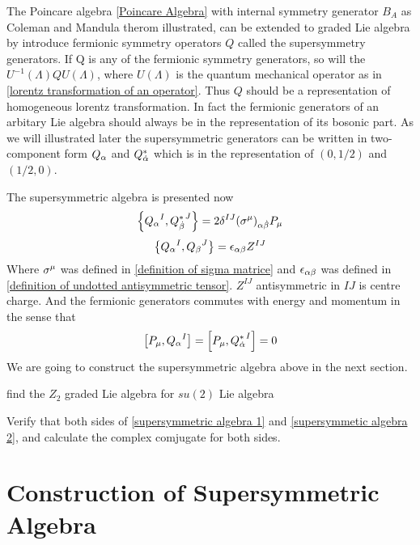     The Poincare algebra \eqref{Poincare Algebra} with internal symmetry generator $B_A$ as Coleman and Mandula therom illustrated, can be extended to graded Lie algebra by introduce fermionic symmetry operators $Q$ called the supersymmetry generators. If Q is any of the fermionic symmetry generators, so will the $U^{-1}(\Lambda) Q U(\Lambda)$, where $U(\Lambda)$ is the quantum mechanical operator as in \eqref{lorentz transformation of an operator}. Thus $Q$ should be a representation of homogeneous lorentz transformation.
    In fact the fermionic generators of an arbitary Lie algebra should always be in the representation of its bosonic part. As we will illustrated later the supersymmetric generators can be written in two-component form $Q_\alpha$ and $Q^{*}_{\dot{\alpha}}$ which is in the representation of $(0,1/2)$ and $(1/2,0)$.  
    
    The supersymmetric algebra is presented now
    \begin{equation}\label{supersymmetric algebra 1}
     \acomm{\uQ{\a}{I}}{\lQ{\dob}{J}}
     = 2 \de^{IJ} (\s^{\m})_{\a\dob}P_{\m}
    \end{equation}
    \begin{equation}\label{supersymmetic algebra 2}
    \acomm{\uQ{\a}{I}}{\uQ{\be}{J}}
    = \e_{\a\be}Z^{IJ}
    \end{equation}
    Where $\sigma^{\mu}$ was defined in \eqref{definition of sigma matrice} and $\epsilon_{\alpha\beta}$ was defined in \eqref{definition of undotted antisymmetric tensor}. $Z^{IJ}$ antisymmetric in $IJ$ is centre charge. And the fermionic generators commutes with energy and momentum in the sense that 
    \begin{equation}
    \comm{P_\m}{\uQ{\a}{I}} = 
    \comm{P_\m}{\lQ{\doa}{I}} = 0
    \end{equation} 
    We are going to construct the supersymmetric algebra above in the next section.
    
    \begin{Exe}
    	find the $Z_2$ graded Lie algebra for $su(2)$ Lie algebra
    \end{Exe}
    
    \begin{Exe}
        Verify that both sides of \eqref{supersymmetric algebra 1} and \eqref{supersymmetic algebra 2}, and calculate the complex comjugate for both sides.
    \end{Exe}
    
    \section{Construction of Supersymmetric Algebra} 
